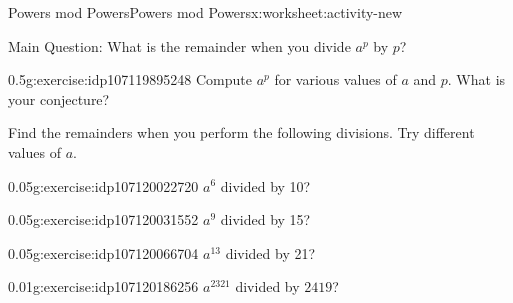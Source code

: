 \documentclass[11pt]{book}
\begin{document}
%
%
\typeout{************************************************}
\typeout{************************************************}
%
\begin{worksheet-subsection}{Powers mod Powers}{}{Powers mod Powers}{}{}{x:worksheet:activity-new}
\begin{introduction}{}%
Main Question: What is the remainder when you divide \(a^p\) by \(p\)?%
\end{introduction}%
\begin{divisionexercise}{1}{}{0.5}{g:exercise:idp107119895248}%
Compute \(a^p\) for various values of \(a\) and \(p\).  What is your conjecture?%
\end{divisionexercise}%
Find the remainders when you perform the following divisions.  Try different values of \(a\).%
\begin{divisionexercise}{2}{}{0.05}{g:exercise:idp107120022720}%
\(a^6\) divided by 10?%
\end{divisionexercise}%
\begin{divisionexercise}{3}{}{0.05}{g:exercise:idp107120031552}%
\(a^9\) divided by 15?%
\end{divisionexercise}%
\begin{divisionexercise}{4}{}{0.05}{g:exercise:idp107120066704}%
\(a^{13}\) divided by 21?%
\end{divisionexercise}%
\begin{divisionexercise}{5}{}{0.01}{g:exercise:idp107120186256}%
\(a^{2321}\) divided by \(2419\)?%
\end{divisionexercise}%
\end{worksheet-subsection}
\restoregeometry
\end{document}
